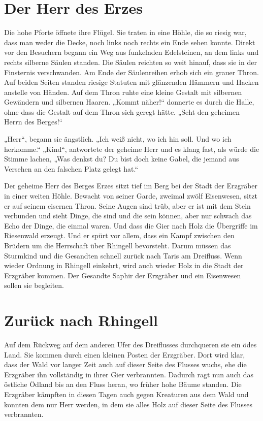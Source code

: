 \documentclass[12pt,a4paper,onecolumn,twoside,ngerman]{book}
\begin{document}
\section{Der Herr des Erzes}
Die hohe Pforte öffnete ihre Flügel. Sie traten in eine Höhle, die so riesig war, dass man weder die Decke, noch links noch rechts ein Ende sehen konnte. Direkt vor den Besuchern begann ein Weg aus funkelnden Edelsteinen, an dem links und rechts silberne Säulen standen. Die Säulen reichten so weit hinauf, dass sie in der Finsternis verschwanden.
Am Ende der Säulenreihen erhob sich ein grauer Thron. Auf beiden Seiten standen riesige Statuten mit glänzenden Hämmern und Hacken anstelle von Händen. Auf dem Thron ruhte eine kleine Gestalt mit silbernen Gewändern und silbernen Haaren. „Kommt näher!“ donnerte es durch die Halle, ohne dass die Gestalt auf dem Thron sich geregt hätte. „Seht den geheimen Herrn des Berges!“ 

„Herr“, begann sie ängstlich. „Ich weiß nicht, wo ich hin soll. Und wo ich herkomme.“
„Kind“, antwortete der geheime Herr und es klang fast, als würde die Stimme lachen, „Was denkst du? Du bist doch keine Gabel, die jemand aus Versehen an den falschen Platz gelegt hat.“

Der geheime Herr des Berges Erzes sitzt tief im Berg bei der Stadt der Erzgräber in einer weiten Höhle. Bewacht von seiner Garde, zweimal zwölf Eisenwesen, sitzt er auf seinem eisernen Thron. Seine Augen sind trüb, aber er ist mit dem Stein verbunden und sieht Dinge, die sind und die sein können, aber nur schwach das Echo der Dinge, die einmal waren. Und dass die Gier nach Holz die Übergriffe im Riesenwald erzeugt. Und er spürt vor allem, dass ein Kampf zwischen den Brüdern um die Herrschaft über Rhingell bevorsteht. Darum müssen das Sturmkind und die Gesandten schnell zurück nach Taris am Dreifluss. Wenn wieder Ordnung in Rhingell einkehrt, wird auch wieder Holz in die Stadt der Erzgräber kommen. Der Gesandte Saphir der Erzgräber und ein Eisenwesen sollen sie begleiten.

\section{Zurück nach Rhingell}
Auf dem Rückweg auf dem anderen Ufer des Dreiflusses durchqueren sie ein ödes Land. Sie kommen durch einen kleinen Posten der Erzgräber. Dort wird klar, dass der Wald vor langer Zeit auch auf dieser Seite des Flusses wuchs, ehe die Erzgräber ihn vollständig in ihrer Gier verbrannten. Dadurch ragt nun auch das östliche Ödland bis an den Fluss heran, wo früher hohe Bäume standen. Die Erzgräber kämpften in diesen Tagen auch gegen Kreaturen aus dem Wald und konnten dem nur Herr werden, in dem sie alles Holz auf dieser Seite des Flusses verbrannten.
\end{document}
